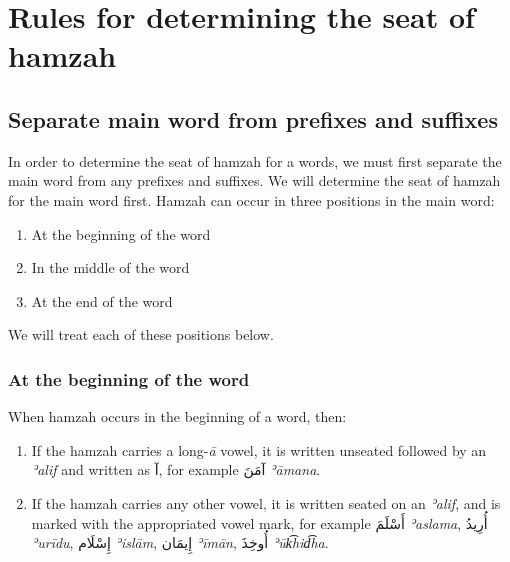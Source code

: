 \documentclass[
  10pt,
]{book}
\providecommand{\tightlist}{%
  \setlength{\itemsep}{0pt}\setlength{\parskip}{0pt}}
\begin{document}
\section{Rules for determining the seat of hamzah}\label{rules-for-determining-the-seat-of-hamzah}

\subsection{Separate main word from prefixes and suffixes}\label{separate-main-word-from-prefixes-and-suffixes}

In order to determine the seat of hamzah for a words, we must first separate the main word from any prefixes and suffixes.
We will determine the seat of hamzah for the main word first.
Hamzah can occur in three positions in the main word:

\begin{enumerate}
\def\labelenumi{\arabic{enumi}.}
\tightlist
\item
  At the beginning of the word
\item
  In the middle of the word
\item
  At the end of the word
\end{enumerate}

We will treat each of these positions below.

\subsubsection{At the beginning of the word}\label{at-the-beginning-of-the-word}

When hamzah occurs in the beginning of a word, then:

\begin{enumerate}
\def\labelenumi{\alph{enumi}.}
\tightlist
\item
  If the hamzah carries a long-\emph{ā} vowel, it is written unseated followed by an \emph{ʾalif} and written as \foreignlanguage{arabic}{آ}, for example \foreignlanguage{arabic}{آمَنَ} \emph{ʾāmana}.
\item
  If the hamzah carries any other vowel, it is written seated on an \emph{ʾalif}, and is marked with the appropriated vowel mark, for example \foreignlanguage{arabic}{أَسْلَمَ} \emph{ʾaslama}, \foreignlanguage{arabic}{أُرِيدُ} \emph{ʾurīdu}, \foreignlanguage{arabic}{إِسْلَام} \emph{ʾislām}, \foreignlanguage{arabic}{إِيمَان} \emph{ʾīmān}, \foreignlanguage{arabic}{أُوخِذَ} \emph{ʾūk͡hid͡ha}.
\end{enumerate}
\end{document}
